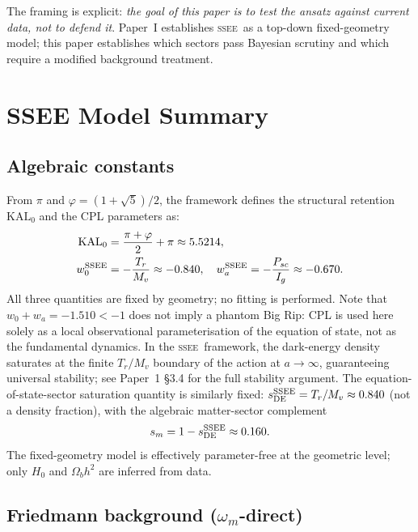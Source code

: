 \documentclass[12pt,a4paper]{article}
\newcommand{\SSEE}{\ifmmode\mathrm{SSEE}\else\textsc{ssee}\fi}
\newcommand{\KALz}{\mathrm{KAL}_0}
\newcommand{\wz}{w_0}
\newcommand{\wa}{w_a}
\begin{document}
The framing is explicit: \textit{the goal of this paper is to test the
ansatz against current data, not to defend it}. Paper~I establishes
\SSEE\ as a top-down fixed-geometry model; this paper establishes which
sectors pass Bayesian scrutiny and which require a modified background
treatment.

\section{SSEE Model Summary}
\label{sec:model}

\subsection{Algebraic constants}

From $\pi$ and $\varphi=(1+\sqrt{5})/2$, the framework defines the
structural retention $\KALz$ and the CPL \citep{Chevallier2001,Linder2003} parameters as:
\begin{align}
  \KALz &= \frac{\pi+\varphi}{2}+\pi \approx 5.5214, \label{eq:kal0} \\
  \wz^{\SSEE} &= -\frac{T_r}{M_v}\approx-0.840, \quad
  \wa^{\SSEE} = -\frac{P_{sc}}{I_g}\approx-0.670.
  \label{eq:ssee_pars}
\end{align}
All three quantities are fixed by geometry; no fitting is performed.
Note that $\wz+\wa=-1.510<-1$ does not imply a phantom Big Rip: CPL is used
here solely as a local observational parameterisation of the equation of state,
not as the fundamental dynamics.  In the \SSEE\ framework, the dark-energy
density saturates at the finite $T_r/M_v$ boundary of the action at
$a\to\infty$, guaranteeing universal stability; see Paper~1 \S3.4
\citep{SSEE_paperI} for the full stability argument.
The equation-of-state-sector saturation quantity is similarly fixed:
$s_{\rm DE}^{\SSEE}=T_r/M_v\approx0.840$ (not a density fraction), with the
algebraic matter-sector complement
\begin{equation}
  s_m = 1-s_{\rm DE}^{\SSEE} \approx 0.160.
  \label{eq:om_eff}
\end{equation}
The fixed-geometry model is effectively parameter-free at the geometric
level; only $H_0$ and $\Omega_b h^2$ are inferred from data.

\subsection{Friedmann background ($\omega_m$-direct)}
\end{document}
